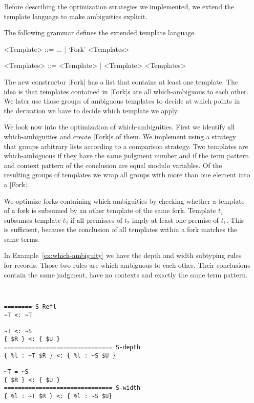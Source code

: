 Before describing the optimization strategies we implemented, we
extend the template language to make ambiguities explicit.

\begin{definition}
    The following grammar defines the extended template language.
    \begin{grammar}
    <Template> ::= $\dots$ | `Fork' <Templates>

    <Templates> ::= <Template> | <Template> <Templates>
    \end{grammar}
\end{definition}

The new constructor \code|Fork| has a list that contains at least one
template. The idea is that templates contained in \code|Fork|s are all
which-ambiguous to each other. We later use those groups of ambiguous
templates to decide at which points in the derivation we have to
decide which template we apply.

We look now into the optimization of which-ambiguities. First we
identify all which-ambiguities and create \code|Fork|s of them. We
implement using a strategy that groups arbitrary lists according to a
comparison strategy. Two templates are which-ambiguous if they have
the same judgment number and if the term pattern and context pattern
of the conclusion are equal modulo variables. Of the resulting groups
of templates we wrap all groups with more than one element into a
\code|Fork|.

We optimize forks containing which-ambiguities by checking whether a
template of a fork is subsumed by an other template of the same
fork. Template $t_1$ subsumes template $t_2$ if all premisses of $t_2$
imply at least one premise of $t_1$. This is sufficient, because the
conclusion of all templates within a fork matches the same terms.

In Example~\ref{ex:which-ambiguity} we have the depth and width
subtyping rules for records. Those two rules are which-ambiguous to
each other. Their conclusions contain the same judgment, have no
contexts and exactly the same term pattern.

\begin{example}{~}
\begin{lstlisting}[language=sltc]
======== S-Refl
~T <: ~T

~T <: ~S
{ $R } <: { $U }
=============================== S-depth
{ %l : ~T $R } <: { %l : ~S $U }

~T = ~S
{ $R } <: { $U }
=============================== S-width
{ %l : ~T $R } <: { %l : ~S $U}
\end{lstlisting}
\label{ex:which-ambiguity}
\end{example}


